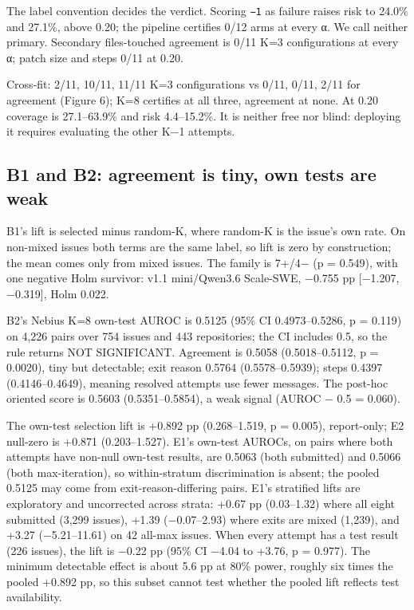 \documentclass[
]{article}
\begin{document}
The label convention decides the verdict. Scoring \texttt{−1} as failure
raises risk to 24.0\% and 27.1\%, above 0.20; the pipeline certifies
0/12 arms at every α. We call neither primary. Secondary files-touched
agreement is 0/11 K=3 configurations at every α; patch size and steps
0/11 at 0.20.

Cross-fit: 2/11, 10/11, 11/11 K=3 configurations vs 0/11, 0/11, 2/11 for
agreement (Figure 6); K=8 certifies at all three, agreement at none. At
0.20 coverage is 27.1--63.9\% and risk 4.4--15.2\%. It is neither free
nor blind: deploying it requires evaluating the other K−1 attempts.

\subsection{B1 and B2: agreement is tiny, own tests are
weak}\label{b1-and-b2-agreement-is-tiny-own-tests-are-weak}

B1's lift is selected minus random-K, where random-K is the issue's own
rate. On non-mixed issues both terms are the same label, so lift is zero
by construction; the mean comes only from mixed issues. The family is
7+/4− (p = 0.549), with one negative Holm survivor: v1.1 mini/Qwen3.6
Scale-SWE, −0.755 pp {[}−1.207, −0.319{]}, Holm 0.022.

B2's Nebius K=8 own-test AUROC is 0.5125 (95\% CI 0.4973--0.5286, p =
0.119) on 4,226 pairs over 754 issues and 443 repositories; the CI
includes 0.5, so the rule returns NOT SIGNIFICANT. Agreement is 0.5058
(0.5018--0.5112, p = 0.0020), tiny but detectable; exit reason 0.5764
(0.5578--0.5939); steps 0.4397 (0.4146--0.4649), meaning resolved
attempts use fewer messages. The post-hoc oriented score is 0.5603
(0.5351--0.5854), a weak signal (\textbar AUROC − 0.5\textbar{} =
0.060).

The own-test selection lift is +0.892 pp (0.268--1.519, p = 0.005),
report-only; E2 null-zero is +0.871 (0.203--1.527). E1's own-test
AUROCs, on pairs where both attempts have non-null own-test results, are
0.5063 (both submitted) and 0.5066 (both max-iteration), so
within-stratum discrimination is absent; the pooled 0.5125 may come from
exit-reason-differing pairs. E1's stratified lifts are exploratory and
uncorrected across strata: +0.67 pp (0.03--1.32) where all eight
submitted (3,299 issues), +1.39 (−0.07--2.93) where exits are mixed
(1,239), and +3.27 (−5.21--11.61) on 42 all-max issues. When every
attempt has a test result (226 issues), the lift is −0.22 pp (95\% CI
−4.04 to +3.76, p = 0.977). The minimum detectable effect is about 5.6
pp at 80\% power, roughly six times the pooled +0.892 pp, so this subset
cannot test whether the pooled lift reflects test availability.
\end{document}

